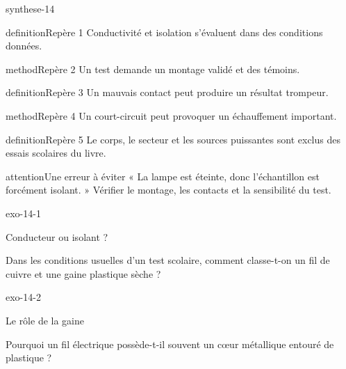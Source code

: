 \documentclass[12pt,twoside,openany]{book}
\begin{document}
\begin{pcFiche}{synthese-14}
\begin{pcEncadre}{definition}{Repère 1}
Conductivité et isolation s’évaluent dans des conditions données.\par
\end{pcEncadre}
\begin{pcEncadre}{method}{Repère 2}
Un test demande un montage validé et des témoins.\par
\end{pcEncadre}
\begin{pcEncadre}{definition}{Repère 3}
Un mauvais contact peut produire un résultat trompeur.\par
\end{pcEncadre}
\begin{pcEncadre}{method}{Repère 4}
Un court-circuit peut provoquer un échauffement important.\par
\end{pcEncadre}
\begin{pcEncadre}{definition}{Repère 5}
Le corps, le secteur et les sources puissantes sont exclus des essais scolaires du livre.\par
\end{pcEncadre}
\begin{pcEncadre}{attention}{Une erreur à éviter}
« La lampe est éteinte, donc l’échantillon est forcément isolant. » Vérifier le montage, les contacts et la sensibilité du test.\par
\end{pcEncadre}
\end{pcFiche}
\clearpage{}
\begin{blocLivre}{exo-14-1}
\begin{exercice}[1]{Conducteur ou isolant ?}
\begin{questions}
\item Dans les conditions usuelles d’un test scolaire, comment classe-t-on un fil de cuivre et une gaine plastique sèche ?
\end{questions}
\end{exercice}\end{blocLivre}
\begin{blocLivre}{exo-14-2}
\begin{exercice}[1]{Le rôle de la gaine}
\begin{questions}
\item Pourquoi un fil électrique possède-t-il souvent un cœur métallique entouré de plastique ?
\end{questions}
\end{exercice}\end{blocLivre}
\end{document}
